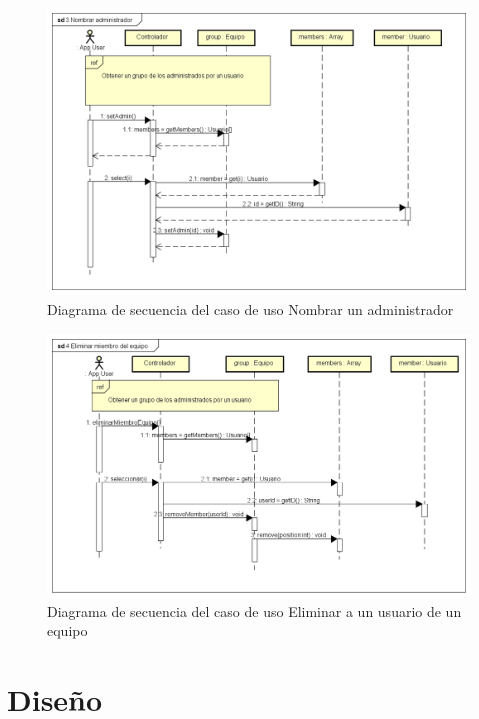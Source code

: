 \documentclass[twoside]{report}
\begin{document}
\begin{figure}[H]
\includegraphics[scale=0.5]{images/sequenceNameAdmin}
\caption{Diagrama de secuencia del caso de uso Nombrar un administrador}
\end{figure}

\begin{figure}[H]
\includegraphics[scale=0.5]{images/sequenceDeleteMember}
\caption{Diagrama de secuencia del caso de uso Eliminar a un usuario de un equipo}
\end{figure}

\section{Diseño}
\end{document}
